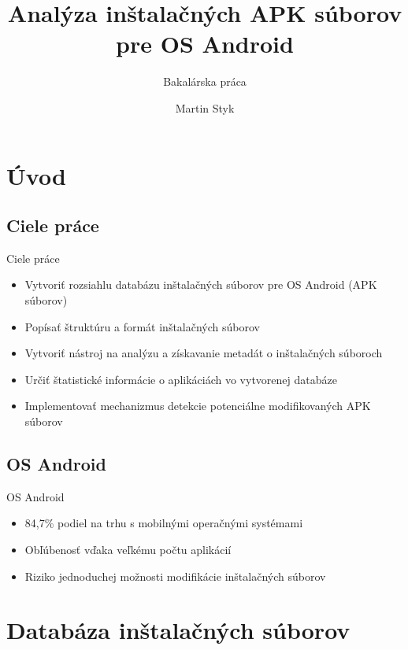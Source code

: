\documentclass{beamer}
\title{Analýza inštalačných APK súborov pre OS Android} %
\subtitle{Bakalárska práca} %
\author{Martin Styk}
\begin{document}
  \frame{\maketitle}


\section{Úvod}
  \subsection{Ciele práce}
  \begin{frame}[label=lists]{Ciele práce}
    \begin{itemize}
    \item Vytvoriť rozsiahlu databázu inštalačných súborov pre OS Android (APK súborov)
\item Popísať štruktúru a formát inštalačných súborov
\item Vytvoriť nástroj na analýzu a získavanie metadát o inštalačných súboroch
\item Určiť štatistické informácie o aplikáciách vo vytvorenej databáze
\item Implementovať mechanizmus detekcie potenciálne modifikovaných APK súborov
    \end{itemize}  
  \end{frame}

\subsection{OS Android}
  \begin{frame}[label=lists]{OS Android}
    \begin{itemize}
    \item 84,7\% podiel na trhu s mobilnými operačnými systémami \cite{marketshare}
\item Obľúbenosť vďaka veľkému počtu aplikácií
\item Riziko jednoduchej možnosti modifikácie inštalačných súborov
    \end{itemize}  
  \end{frame}  
  
\section{Databáza inštalačných súborov}
\end{document}
